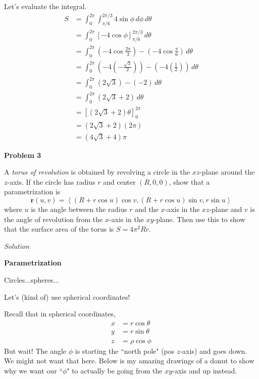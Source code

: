 \documentclass{article}
\newcommand{\lrp}[1]{\left( #1 \right)}
\newcommand{\lra}[1]{\left\langle #1 \right\rangle}
\newcommand{\lrb}[1]{\left[ #1 \right]}
\renewcommand{\r}[0]{\mathbf{r}}
\newcommand{\Solution}{\textit{Solution}}
\begin{document}
Let's evaluate the integral.
\begin{align*}
    S&=\int_0^{2\pi}\int_{\pi/6}^{2\pi/3}4\sin\phi\,d\phi\,d\theta\\
    &=\int_0^{2\pi}\lrb{-4\cos\phi}_{\pi/6}^{2\pi/3}\,d\theta\\
    &=\int_0^{2\pi}\lrp{-4\cos\frac{2\pi}{3}}-\lrp{-4\cos\frac{\pi}{6}}\,d\theta\\
    &=\int_0^{2\pi}\lrp{-4\lrp{-\frac{\sqrt{3}}{2}}}-\lrp{-4\lrp{\frac{1}{2}}}\,d\theta\\
    &=\int_0^{2\pi}\lrp{2\sqrt{3}}-\lrp{-2}\,d\theta\\
    &=\int_0^{2\pi} \lrp{2\sqrt{3}+2}\,d\theta\\
    &=\lrb{\lrp{2\sqrt{3}+2}\theta}_0^{2\pi}\\
    &=\lrp{2\sqrt{3}+2}\lrp{2\pi}\\
    &=\boxed{\lrp{4\sqrt{3}+4}\pi}
\end{align*}
\newpage
{}
{}\textbf{Problem 3}

A \textit{torus of revolution} is obtained by revolving a circle in the $xz$-plane around the
$z$-axis. If the circle has radius $r$ and center $(R,0,0)$, show that a parametrization is
\begin{equation*}
    \r(u,v)=\lra{(R+r\cos u)\cos v, (R+r\cos u)\sin v, r\sin u}
\end{equation*}
where $u$ is the angle between the radius $r$ and the $x$-axis in the $xz$-plane and $v$ is the
angle of revolution from the $x$-axis in the $xy$-plane. Then use this to show that the
surface area of the torus is $S = 4\pi^2Rr$.

\Solution

{}\textbf{Parametrization}

Circles...spheres...

Let's (kind of) use spherical coordinates!

Recall that in spherical coordinates,
\begin{align*}
    x&=r\cos\theta\\
    y&=r\sin\theta\\
    z&=\rho\cos\phi
\end{align*}
But wait! The angle $\phi$ is starting the ``north pole" (pos $z$-axis) and goes down. We might not want that here. Below is my amazing drawings of a donut to show why we want our ``$\phi$" to actually be going from the $xy$-axis and up instead.
\end{document}
